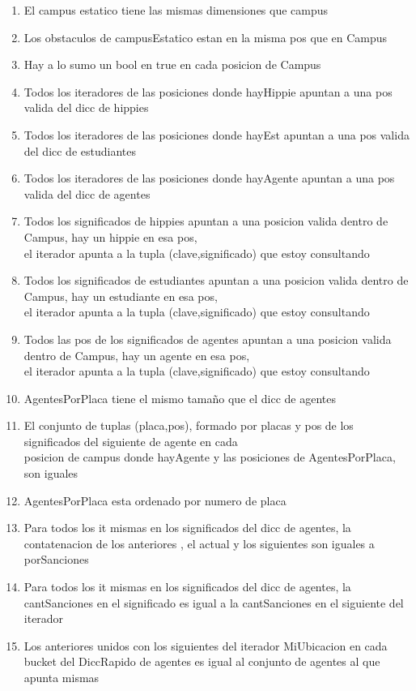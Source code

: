 \begin{enumerate}
  \item El campus estatico tiene las mismas dimensiones que campus
  \item Los obstaculos de campusEstatico estan en la misma pos que en Campus
  \item Hay a lo sumo un bool en true en cada posicion de Campus
  \item Todos los iteradores de las posiciones donde hayHippie apuntan a una pos valida del dicc de hippies
  \item Todos los iteradores de las posiciones donde hayEst apuntan a una pos valida del dicc de estudiantes
  \item Todos los iteradores de las posiciones donde hayAgente apuntan a una pos valida del dicc de agentes
  \item Todos los significados de hippies apuntan a una posicion valida dentro de Campus, hay un hippie en esa pos,
        \\el iterador apunta a la tupla (clave,significado) que estoy consultando
  \item Todos los significados de estudiantes apuntan a una posicion valida dentro de Campus, hay un estudiante en esa pos,
        \\el iterador apunta a la tupla (clave,significado) que estoy consultando
  \item Todos las pos de los significados de agentes apuntan a una posicion valida dentro de Campus, hay un agente en esa pos,
        \\el iterador apunta a la tupla (clave,significado) que estoy consultando
  \item AgentesPorPlaca tiene el mismo tamaño que el dicc de agentes
  \item El conjunto de tuplas (placa,pos), formado por  placas y pos de los significados del siguiente de agente en cada 
        \\posicion de campus donde hayAgente y las posiciones de AgentesPorPlaca, son iguales
  \item AgentesPorPlaca esta ordenado por numero de placa
  \item Para todos los it mismas en los significados del dicc de agentes, la contatenacion de los anteriores , el actual y los siguientes son iguales a porSanciones
  \item Para todos los it mismas en los significados del dicc de agentes, la cantSanciones en el significado es igual a la cantSanciones en el siguiente del iterador
  \item Los anteriores unidos con los siguientes del iterador MiUbicacion en cada bucket del DiccRapido de agentes es igual al conjunto de agentes al que apunta mismas

\end{enumerate}
